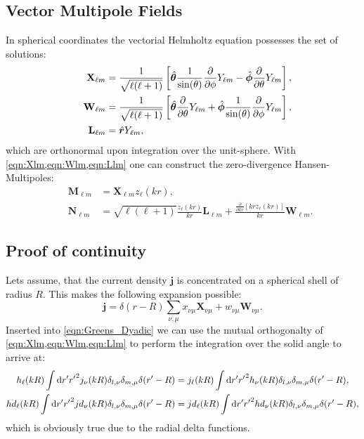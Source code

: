 \subsection{Vector Multipole Fields}
In spherical coordinates the vectorial Helmholtz equation possesses the set of
solutions:
\begin{align}
&& \mathbf{X}_{\ell m} &= \frac{1}{\sqrt{\ell(\ell+1)}} \left[
\hat{\bm{\theta}} \frac{1}{\sin(\theta)} \frac{\partial}{\partial \phi} Y_{\ell m} -
\hat{\bm{\phi}} \frac{\partial}{\partial \theta} Y_{\ell m}
\right], \label{eqn:Xlm}\\
&& \mathbf{W}_{\ell m} &= \frac{1}{\sqrt{\ell(\ell+1)}} \left[
\hat{\bm{\theta}} \frac{\partial}{\partial \theta} Y_{\ell m} +
\hat{\bm{\phi}} \frac{1}{\sin(\theta)} \frac{\partial}{\partial \phi} Y_{\ell m} 
\right], \label{eqn:Wlm}\\
&& \mathbf{L}_{\ell m} &= \hat{\bm{r}} Y_{\ell m},\label{eqn:Llm}
\end{align}
which are orthonormal upon integration over the unit-sphere. With \cref{eqn:Xlm,eqn:Wlm,eqn:Llm} one can construct the zero-divergence Hansen-Multipoles:
\begin{align}
&& \mathbf{M}_{\ell m} &= \mathbf{X}_{\ell m} z_\ell(kr),
\label{eqn:Mlm} \\
&& \mathbf{N}_{\ell m} &= \sqrt{\ell(\ell+1)} \frac{z_\ell(kr)}{kr} \mathbf{L}_{\ell m}+
\frac{\frac{\partial}{\partial kr}\left[kr z_\ell(kr)\right]}{kr}\mathbf{W}_{\ell m}. \label{eqn:Nlm}
\end{align}

\subsection{Proof of continuity}
\label{sec:Gproof}
Lets assume, that the current density $\mathbf{j}$ is concentrated on a spherical shell of radius $R$. This makes the following expansion possible:
\begin{equation}
\mathbf{j} = \delta(r-R)\sum_{\nu,\mu} x_{\nu \mu} \mathbf{X}_{\nu \mu} + w_{\nu \mu} \mathbf{W}_{\nu \mu}.
\end{equation}
Inserted into \cref{eqn:Greens_Dyadic} we can use the mutual orthogonalty of \cref{eqn:Xlm,eqn:Wlm,eqn:Llm} to perform the integration over the solid angle to arrive at:
\begin{align}
h_\ell(kR) \int \mathrm{d} r' {r'}^2j_\nu(kR)\delta_{l, \nu}\delta_{m,\mu} \delta(r'-R) 
&= 
j_\ell(kR) \int \mathrm{d} r' {r'}^2h_\nu(kR)\delta_{l, \nu}\delta_{m,\mu} \delta(r'-R),\\
hd_\ell(kR) \int \mathrm{d} r' {r'}^2jd_\nu(kR)\delta_{l, \nu}\delta_{m,\mu} \delta(r'-R) 
&= 
jd_\ell(kR) \int \mathrm{d} r' {r'}^2hd_\nu(kR)\delta_{l, \nu}\delta_{m,\mu} \delta(r'-R),
\end{align}
which is obviously true due to the radial delta functions.